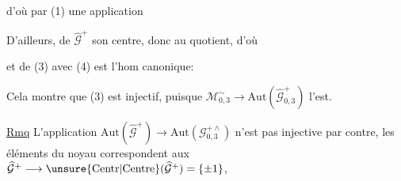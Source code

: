 d'où par (1) une application


D'ailleurs,   de $\widehat{\mathcal{G}}^{+}$ 
son centre, donc  au quotient, d'où


et  de (3) avec (4) est l'hom
canonique:


Cela montre que (3) est injectif, puisque
$\mathcal{M}_{0,3}^{\sim}\longrightarrow\mathrm{Aut}(\widehat{\mathcal{G}}_{0,3}^{+})$
l'est. 

\uline{Rmq} L'application
$\mathrm{Aut}(\widehat{\mathcal{G}}^{+})\longrightarrow\mathrm{Aut}(\mathcal{G}_{0,3}^{+\wedge})$
n'est pas injective par contre,  les
éléments du noyau correspondent aux
$\widehat{\mathcal{G}}^{+}\longrightarrow\unsure{\mathrm{Centr}|\mathrm{Centre}}(\widehat{\mathcal{G}}^{+})=\{\pm1\}$,



